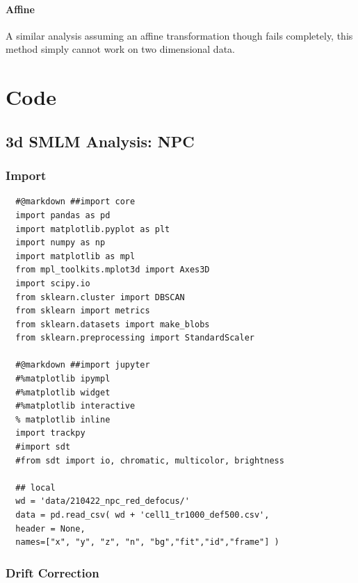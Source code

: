 \documentclass[11pt, a4paper, oneside, twocolumn]{report}
\begin{document}
\subsubsection{Affine}

A similar analysis assuming an affine transformation though fails
completely, this method simply cannot work on two dimensional data.


\appendix


\chapter{Code}\label{ch:code}

\onecolumn


\section{3d SMLM Analysis: NPC}



\subsection{Import}

\begin{verbatim}
  #@markdown ##import core
  import pandas as pd
  import matplotlib.pyplot as plt
  import numpy as np
  import matplotlib as mpl
  from mpl_toolkits.mplot3d import Axes3D
  import scipy.io
  from sklearn.cluster import DBSCAN
  from sklearn import metrics
  from sklearn.datasets import make_blobs
  from sklearn.preprocessing import StandardScaler

  #@markdown ##import jupyter
  #%matplotlib ipympl
  #%matplotlib widget
  #%matplotlib interactive
  % matplotlib inline
  import trackpy
  #import sdt
  #from sdt import io, chromatic, multicolor, brightness
  
  ## local
  wd = 'data/210422_npc_red_defocus/'
  data = pd.read_csv( wd + 'cell1_tr1000_def500.csv',
  header = None,
  names=["x", "y", "z", "n", "bg","fit","id","frame"] )
\end{verbatim}

\subsection{Drift Correction}
\end{document}
